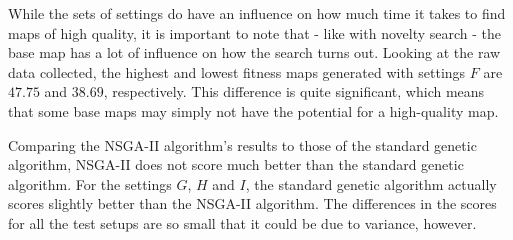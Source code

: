 While the sets of settings do have an influence on how much time it takes to find maps of high quality, it is important to note that - like with novelty search - the base map has a lot of influence on how the search turns out. Looking at the raw data collected, the highest and lowest fitness maps generated with settings $F$ are $47.75$ and $38.69$, respectively. This difference is quite significant, which means that some base maps may simply not have the potential for a high-quality map.

Comparing the  NSGA-II algorithm's results to those of the standard genetic algorithm, NSGA-II does not score much better than the standard genetic algorithm. For the settings $G$, $H$ and $I$, the standard genetic algorithm actually scores slightly better than the NSGA-II algorithm. The differences in the scores for all the test setups are so small that it could be due to variance, however.

\begin{table}[!h]
	\begin{center}
	\renewcommand{\arraystretch}{1}
	\caption{Results of NSGA-II seeded with highest fitness novel individuals.}
	\label{tab:results_novelmoeahighfitness}
	\end{center}
\end{table}

